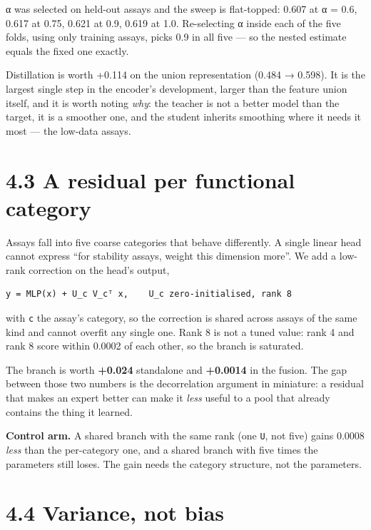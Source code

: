 \documentclass[sigconf,review,nonacm]{acmart}
\begin{document}
α was selected on held-out assays and the sweep is flat-topped: 0.607 at α = 0.6, 0.617 at 0.75, 0.621
at 0.9, 0.619 at 1.0. Re-selecting α inside each of the five folds, using only training assays, picks
0.9 in all five --- so the nested estimate equals the fixed one exactly.

Distillation is worth +0.114 on the union representation (0.484 → 0.598). It is the largest single step
in the encoder's development, larger than the feature union itself, and it is worth noting \emph{why}: the
teacher is not a better model than the target, it is a smoother one, and the student inherits smoothing
where it needs it most --- the low-data assays.

\hypertarget{a-residual-per-functional-category}{%
\section{4.3 A residual per functional category}\label{a-residual-per-functional-category}}

Assays fall into five coarse categories that behave differently. A single linear head cannot express
``for stability assays, weight this dimension more''. We add a low-rank correction on the head's output,

\begin{verbatim}
y = MLP(x) + U_c V_cᵀ x,    U_c zero-initialised, rank 8
\end{verbatim}

with \texttt{c} the assay's category, so the correction is shared across assays of the same kind and cannot
overfit any single one. Rank 8 is not a tuned value: rank 4 and rank 8 score within 0.0002 of each
other, so the branch is saturated.

The branch is worth \textbf{+0.024} standalone and \textbf{+0.0014} in the fusion. The gap between those two
numbers is the decorrelation argument in miniature: a residual that makes an expert better can make it
\emph{less} useful to a pool that already contains the thing it learned.

\textbf{Control arm.} A shared branch with the same rank (one \texttt{U}, not five) gains 0.0008 \emph{less} than the
per-category one, and a shared branch with five times the parameters still loses. The gain needs the
category structure, not the parameters.

\hypertarget{variance-not-bias}{%
\section{4.4 Variance, not bias}\label{variance-not-bias}}
\end{document}
